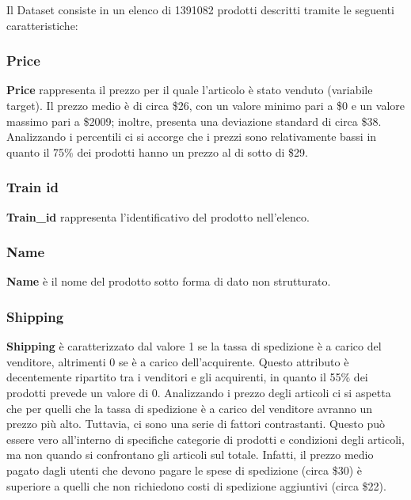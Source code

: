 


Il Dataset consiste in un elenco di 1391082 prodotti descritti tramite le seguenti caratteristiche:
\subsubsection{Price}
\textbf{Price} rappresenta il prezzo per il quale l'articolo è stato venduto (variabile target).
Il prezzo medio è di circa \$26, con un valore minimo pari a \$0 e un valore massimo pari a \$2009; inoltre, presenta una deviazione standard di circa \$38.
Analizzando i percentili ci si accorge che i prezzi sono relativamente bassi in quanto il 75\% dei prodotti hanno un prezzo al di sotto di \$29.
\subsubsection{Train id}
\textbf{Train\_id} rappresenta l'identificativo del prodotto nell'elenco.
\subsubsection{Name}
\textbf{Name} è il nome del prodotto sotto forma di dato non strutturato.
\subsubsection{Shipping}
\textbf{Shipping} è caratterizzato dal valore 1 se la tassa di spedizione è a carico del venditore, altrimenti 0 se è a carico dell'acquirente.
Questo attributo è decentemente ripartito tra i venditori e gli acquirenti, in quanto il 55\% dei prodotti prevede un valore di 0.
Analizzando i prezzo degli articoli ci si aspetta che per quelli che la tassa di spedizione è a carico del venditore avranno un prezzo più alto. Tuttavia, ci sono una serie di fattori contrastanti. Questo può essere vero all'interno di specifiche categorie di prodotti e condizioni degli articoli, ma non quando si confrontano gli articoli sul totale. 
Infatti, il prezzo medio pagato dagli utenti che devono pagare le spese di spedizione (circa \$30) è superiore a quelli che non richiedono costi di spedizione aggiuntivi (circa \$22).
